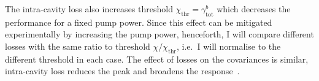 The intra-cavity loss also increases threshold $\chi_\text{thr}=\gamma^b_\text{tot}$ which decreases the performance for a fixed pump power. Since this effect can be mitigated experimentally by increasing the pump power, henceforth, I will compare different losses with the same ratio to threshold $\chi/\chi_\text{thr}$, i.e.\ I will normalise to the different threshold in each case. %
The effect of losses on the covariances is similar, intra-cavity loss reduces the peak and broadens the response~\cite{}.



